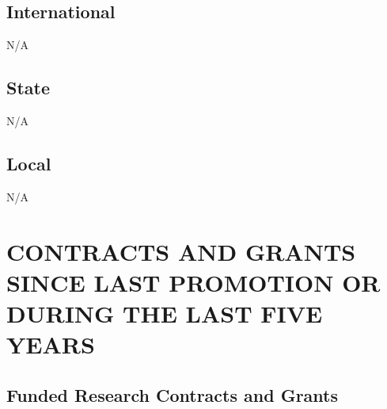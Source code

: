 \documentclass{article}
\begin{document}
\subsection*{International}

N/A

\subsection*{State}

N/A

\subsection*{Local}
N/A

\section{CONTRACTS AND GRANTS SINCE LAST PROMOTION OR DURING THE LAST
  FIVE YEARS}

\subsection*{Funded Research Contracts and Grants}
\end{document}
